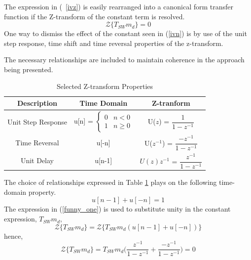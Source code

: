\documentclass[conference]{IEEEtran}
\begin{document}
The expression in (~\ref{ivz}) is easily rearranged into a canonical form transfer function if the Z-transform of the constant term is resolved.
\begin{equation}
 \mathcal{Z} \{ T_{SW} m_d \} = 0 \label{zconst}
\end{equation}
One way to dismiss the effect of the constant seen in (\ref{ivn}) is by use of the unit step response, time shift and time reversal properties of the z-transform.

The necessary relationships are included to maintain coherence in the approach being presented.

\begin{table}[H]
	\caption{Selected Z-transform Properties}
	\begin{center}
		\begin{tabular}{|c|c|c|}
			\hline
			\textbf{Description}& \textbf{Time Domain}& \textbf{Z-tranform}\\
			\hline
			Unit Step Response & 
			u[n] =
			$ \begin{cases} 
				0 & n < 0 \\
				1 & n \geq 0 
			\end{cases} $ 
			 & U($ \mathit{z} $) = $\dfrac{1}{1-z^{-1}}$ \\
			\hline
			
			
			Time Reversal& u[-n]& U($ \mathit{z^{-1}} $) = $\dfrac{-z^{-1}}{1-z^{-1}}$  \\
			\hline
			Unit Delay & u[n-1] & $U( \mathit{z} )\mathit{z^{-1}}$ = $\dfrac{z^{-1}}{1-z^{-1}}$  \\
			\hline

		\end{tabular}
		\label{tabun}
	\end{center}
\end{table}

The choice of relationships expressed in Table \ref{tabun} plays on the following time-domain property. 
\begin{equation}
u[n-1] + u[-n] = 1 \label{funny_one}
\end{equation}
The expression in (\ref{funny_one}) is used to substitute unity in the constant expression, $ T_{SW} m_d $,
\begin{equation}
	\mathcal{Z}\{ T_{SW} m_d \} = 
	\mathcal{Z}\{ T_{SW} m_d (u[n-1] + u[-n]) \}
\end{equation}
hence,
\begin{equation}
\mathcal{Z}\{ T_{SW} m_d \} = T_{SW} m_d \bigg( \dfrac{z^{-1}}{1-z^{-1}} + \dfrac{-z^{-1}}{1-z^{-1}} \bigg) = 0
\end{equation}
\end{document}
